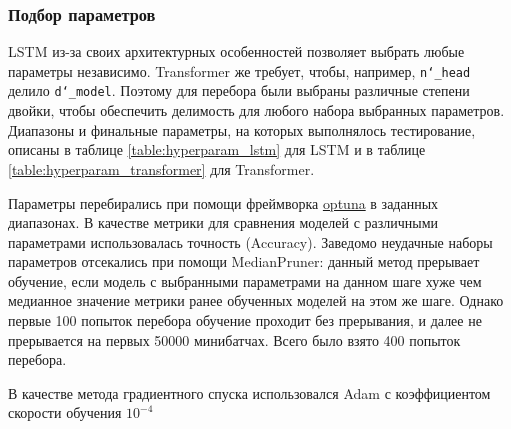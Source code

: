 \documentclass[diploma]{nanolab2015}
\begin{document}
\subsubsection{Подбор параметров}
LSTM из-за своих архитектурных особенностей позволяет выбрать любые параметры независимо. Transformer же требует, чтобы, например, \texttt{n\char`_head} делило \texttt{d\char`_model}. Поэтому для перебора были выбраны различные степени двойки, чтобы обеспечить делимость для любого набора выбранных параметров. Диапазоны и финальные параметры, на которых выполнялось тестирование, описаны в таблице \ref{table:hyperparam_lstm} для LSTM и в таблице \ref{table:hyperparam_transformer} для Transformer.

Параметры перебирались при помощи фреймворка \href{https://optuna.org/}{optuna} в заданных диапазонах. В качестве метрики для сравнения моделей с различными параметрами использовалась точность (Accuracy). Заведомо неудачные наборы параметров отсекались при помощи MedianPruner: данный метод прерывает обучение, если модель с выбранными параметрами на данном шаге хуже чем медианное значение метрики ранее обученных моделей на этом же шаге. Однако первые 100 попыток перебора обучение проходит без прерывания, и далее не прерывается на первых 50000 минибатчах. Всего было взято 400 попыток перебора.

В качестве метода градиентного спуска использовался Adam с коэффициентом скорости обучения $10^{-4}$
\end{document}
